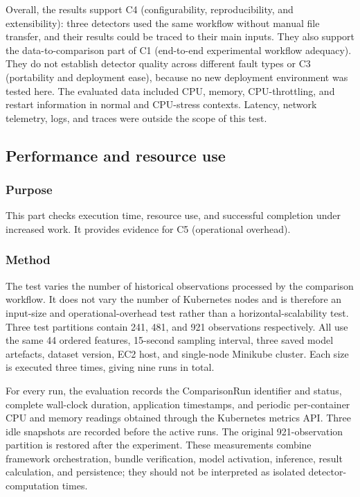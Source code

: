 Overall, the results support C4 (configurability, reproducibility, and
extensibility): three detectors used the same workflow without manual file
transfer, and their results could be traced to their main inputs. They also
support the data-to-comparison part of C1 (end-to-end experimental workflow
adequacy). They do not establish detector quality across different
fault types or C3 (portability and deployment ease), because no new deployment
environment was tested here. The evaluated data included CPU, memory,
CPU-throttling, and restart information in normal and CPU-stress contexts.
Latency, network telemetry, logs, and traces were outside the scope of this
test.

\subsection{Performance and resource use}

\subsubsection{Purpose}

This part checks execution time, resource use, and successful completion under increased work. It provides evidence for C5 (operational overhead).

\subsubsection{Method}

The test varies the number of historical observations processed by the comparison workflow. It does not vary the number of Kubernetes nodes and is therefore an input-size and operational-overhead test rather than a horizontal-scalability test. Three test partitions contain 241, 481, and 921 observations respectively. All use the same 44 ordered features, 15-second sampling interval, three saved model artefacts, dataset version, EC2 host, and single-node Minikube cluster. Each size is executed three times, giving nine runs in total.

For every run, the evaluation records the ComparisonRun identifier and status, complete wall-clock duration, application timestamps, and periodic per-container CPU and memory readings obtained through the Kubernetes metrics API. Three idle snapshots are recorded before the active runs. The original 921-observation partition is restored after the experiment. These measurements combine framework orchestration, bundle verification, model activation, inference, result calculation, and persistence; they should not be interpreted as isolated detector-computation times.

